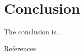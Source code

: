 \documentclass[12pt, twoside , openright]{book}
\begin{document}
\chapter{Conclusion}
The conclusion is... \blindtext[1] %
\newpage
\mbox{}
\newpage



{}
\begin{center}
	{\chinnesesize References}
\end{center}



\newpage
\mbox{}
\newpage
\end{document}
